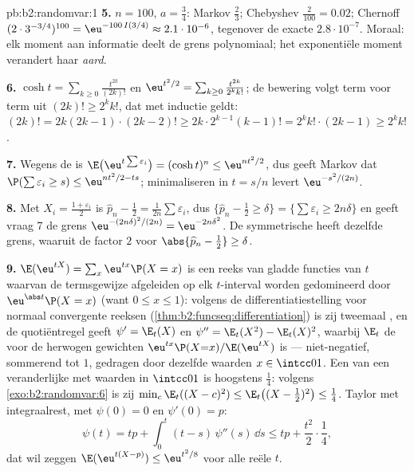 \begin{solution}{pb:b2:randomvar:1}
\textbf{5.} $n = 100$, $a = \frac34$: Markov $\frac23$; Chebyshev
$\frac2{100} = 0.02$; Chernoff $(2\cdot3^{-3/4})^{100} =
\eu^{-100\,I(3/4)} \approx 2.1\cdot10^{-6}$, tegenover de exacte
$2.8\cdot10^{-7}$. Moraal: elk moment aan informatie deelt de grens
polynomiaal; het exponentiële moment verandert haar \emph{aard}.

\textbf{6.} $\cosh t = \sum_{k\geq0}\frac{t^{2k}}{(2k)!}$ en
$\eu^{t^2/2} = \sum_{k\geq0}\frac{t^{2k}}{2^kk!}$; de bewering
volgt term voor term uit $(2k)! \geq 2^kk!$, dat met inductie
geldt: $(2k)! = 2k(2k-1)\cdot(2k-2)! \geq 2k\cdot 2^{k-1}(k-1)! =
2^kk!\cdot(2k-1) \geq 2^kk!$.

\textbf{7.} Wegens de  is
$\E\bigl(\eu^{t\sum\varepsilon_i} \bigr) = (\cosh t)^n \leq
\eu^{nt^2/2}$, dus geeft Markov dat $\P(\sum\varepsilon_i \geq s)
\leq \eu^{nt^2/2 - ts}$; minimaliseren in $t = s/n$ levert
$\eu^{-s^2/(2n)}$.

\textbf{8.} Met $X_i = \frac{1 + \varepsilon_i}2$ is $\widehat p_n
- \frac12 = \frac1{2n}\sum\varepsilon_i$, dus $\{\widehat p_n -
\frac12 \geq \delta\} = \{\sum\varepsilon_i \geq 2n\delta\}$ en
geeft vraag 7 de grens $\eu^{-(2n\delta)^2/(2n)} =
\eu^{-2n\delta^2}$. De symmetrische  heeft dezelfde
grens, waaruit de factor $2$ voor $\abs{\widehat p_n - \frac12}
\geq \delta$.

\textbf{9.} $\E(\eu^{tX}) = \sum_x\eu^{tx}\P(X = x)$ is een reeks
van gladde functies van $t$ waarvan de termsgewijze afgeleiden op
elk  $t$-interval worden gedomineerd door
$\eu^{\abs t}\P(X = x)$ (want $0 \leq x \leq 1$): volgens de
differentiatiestelling voor normaal convergente reeksen
(\cref{thm:b2:funcseq:differentiation}) is zij tweemaal
, en de quotiëntregel geeft $\psi' = \E_t(X)$ en
$\psi'' = \E_t(X^2) - \E_t(X)^2$, waarbij $\E_t$ de
 voor de herwogen gewichten
$\eu^{tx}\P(X{=}x)/\E(\eu^{tX})$ is --- niet-negatief, sommerend
tot $1$, gedragen door dezelfde waarden $x \in \intcc01$. Een
 van een veranderlijke met waarden in $\intcc01$ is
hoogstens $\frac14$: volgens \cref{exo:b2:randomvar:6} is zij
$\min_c\E_t((X - c)^2) \leq \E_t\bigl((X - \tfrac12)^2\bigr) \leq
\tfrac14$. Taylor met integraalrest, met $\psi(0) = 0$ en $\psi'(0)
= p$:
\[
\psi(t) = tp + \int_0^t(t - s)\,\psi''(s)\,\dd s
\leq tp + \frac{t^2}2\cdot\frac14,
\]
dat wil zeggen $\E(\eu^{t(X - p)}) \leq \eu^{t^2/8}$ voor alle
reële $t$.


\end{solution}
